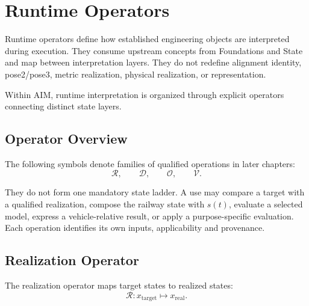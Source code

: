 
\chapter{Runtime Operators}

\label{chap:runtime-operators}


Runtime operators define how established engineering objects are
interpreted during execution. They consume upstream concepts from
Foundations and State and map between interpretation layers. They do not
redefine alignment identity, pose2/pose3, metric realization, physical
realization, or representation.

\begin{principle}
\label{princ:operator-layer-principle}
Within AIM, runtime interpretation is organized through explicit
operators connecting distinct state layers.
\end{principle}

\section{Operator Overview}

The following symbols denote families of qualified operations in later
chapters:
\[
\mathcal R,
\qquad
\mathcal D,
\qquad
\mathcal O,
\qquad
\mathcal V.
\]

They do not form one mandatory state ladder. A use may compare a target with a
qualified realization, compose the railway state with \(s(t)\), evaluate a
selected model, express a vehicle-relative result, or apply a purpose-specific
evaluation. Each operation identifies its own inputs, applicability and
provenance.

\section{Realization Operator}

\begin{definition}
\label{def:runtime-realization-operator}
The realization operator maps target states to realized states:
\[
\mathcal R :
x_{\mathrm{target}}
\mapsto
x_{\mathrm{real}}.
\]
\end{definition}

